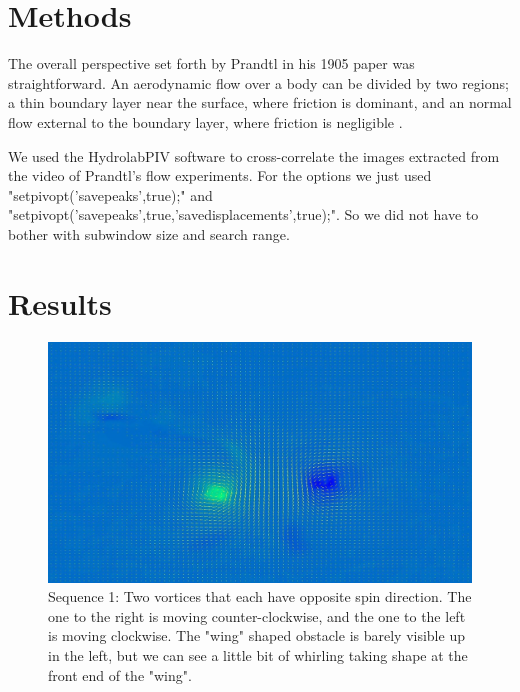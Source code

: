 \documentclass[english,a4paper,12pt]{article}
\begin{document}
\section*{Methods}
The overall perspective set forth by Prandtl in his 1905 paper was straightforward. An aerodynamic flow over a body can be divided by two regions; a thin boundary layer near the surface, where friction is dominant, and an normal flow external to the boundary layer, where friction is negligible \cite{Luddy}. \\ \bigskip

We used the HydrolabPIV software to cross-correlate the images extracted from the video of Prandtl's flow experiments. For the options we just used "setpivopt('savepeaks',true);" and "setpivopt('savepeaks',true,'savedisplacements',true);". So we did not have to bother with subwindow size and search range.


\section*{Results}

\begin{figure}[H]
    \centering
    \includegraphics[width=140mm]{seq1.png}
    \caption{Sequence 1: Two vortices that each have opposite spin direction. The one to the right is moving counter-clockwise, and the one to the left is moving clockwise. The "wing" shaped obstacle is barely visible up in the left, but we can see a little bit of whirling taking shape at the front end of the "wing".}
    \label{fig:1}
\end{figure}
\end{document}

